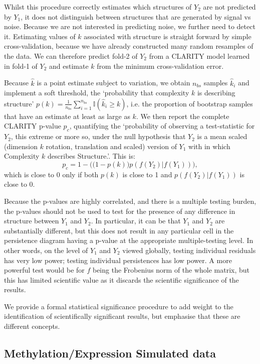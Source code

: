 \documentclass[a4]{article}
\newcommand{\+}[1]{\mathbf{#1}}
\begin{document}
Whilst this procedure correctly estimates which structures of $Y_2$ are not predicted by $Y_1$, it does not distinguish between structures that are generated by signal vs noise. Because we are not interested in predicting noise, we further need to detect it. Estimating values of $k$ associated with structure is straight forward by simple cross-validation, because we have already constructed many random resamples of the data. We can therefore predict fold-2 of $Y_2$ from a CLARITY model learned in fold-1 of $Y_2$ and estimate $\hat{k}$ from the minimum cross-validation error.

Because $\hat{k}$ is a point estimate subject to variation, we obtain $n_{bs}$ samples $\hat{k}_i$ and implement a soft threshold, the `probability that complexity $k$ is describing structure' $p(k) = \frac{1}{n_{bs}} \sum_{i=1}^{n_{bs}}\mathbb{I}(\hat{k}_i \ge k)$, i.e. the proportion of bootstrap samples that have an estimate at least as large as $k$. We then report the complete CLARITY p-value $p_{c}$, quantifying the `probability of observing a test-statistic for $Y_2$, this extreme or more so, under the null hypothesis that $Y_2$ is a mean scaled (dimension $k$ rotation, translation and scaled) version of $Y_1$ with in which Complexity $k$ describes Structure.'. This is:
$$p_{c} = 1-\Big( \big(1-p(k)\big) p(f(Y_2) |f(Y_1)) \Big),$$
which is close to 0 only if both $p(k)$ is close to 1 and  $p(f(Y_2) |f(Y_1))$ is close to 0.

Because the p-values are highly correlated, and there is a multiple testing burden, the p-values should not be used to test for the presence of any difference in structure between $Y_1$ and $Y_2$. In particular, it can be that $Y_1$ and $Y_2$ are substantially different, but this does not result in any particular cell in the persistence diagram having a p-value at the appropriate multiple-testing level. In other words, on the level of $Y_1$ and $Y_2$ viewed globally, testing individual residuals has very low power; testing individual persistences has low power. A more powerful test would be for $f$ being the Frobenius norm of the whole matrix, but this has limited scientific value as it discards the scientific significance of the results.

We provide a formal statistical significance procedure to add weight to the identification of scientifically significant results, but emphasise that these are different concepts.

\subsection{Methylation/Expression Simulated data}
\label{sec:methysim}
\end{document}

